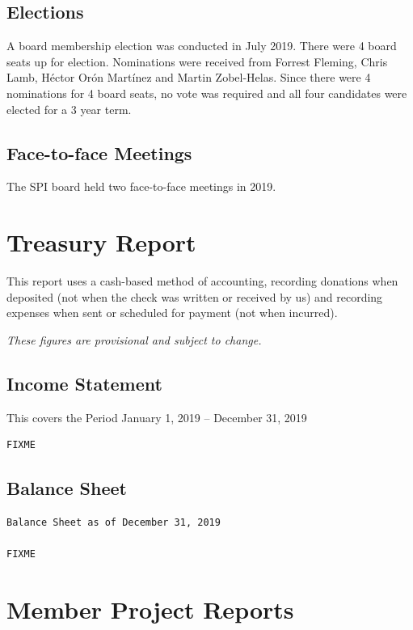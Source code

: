 \documentclass[a4paper]{report}
\begin{document}
\section{Elections}

A board membership election was conducted in July 2019.  There were 4
board seats up for election.  Nominations were received from Forrest
Fleming, Chris Lamb, Héctor Orón Martínez and Martin Zobel-Helas.  Since
there were 4 nominations for 4 board seats, no vote was required and all
four candidates were elected for a 3 year term.

\section{Face-to-face Meetings}

The SPI board held two face-to-face meetings in 2019.

\chapter{Treasury Report}

This report uses a cash-based method of accounting, recording donations
when deposited (not when the check was written or received by us) and
recording expenses when sent or scheduled for payment (not when
incurred).

{\em These figures are provisional and subject to change.}

\section{Income Statement}

This covers the Period January 1, 2019 -- December 31, 2019

\begin{verbatim}
FIXME
\end{verbatim}

\section{Balance Sheet}

\begin{verbatim}
Balance Sheet as of December 31, 2019

FIXME
\end{verbatim}

\chapter{Member Project Reports}
\end{document}
